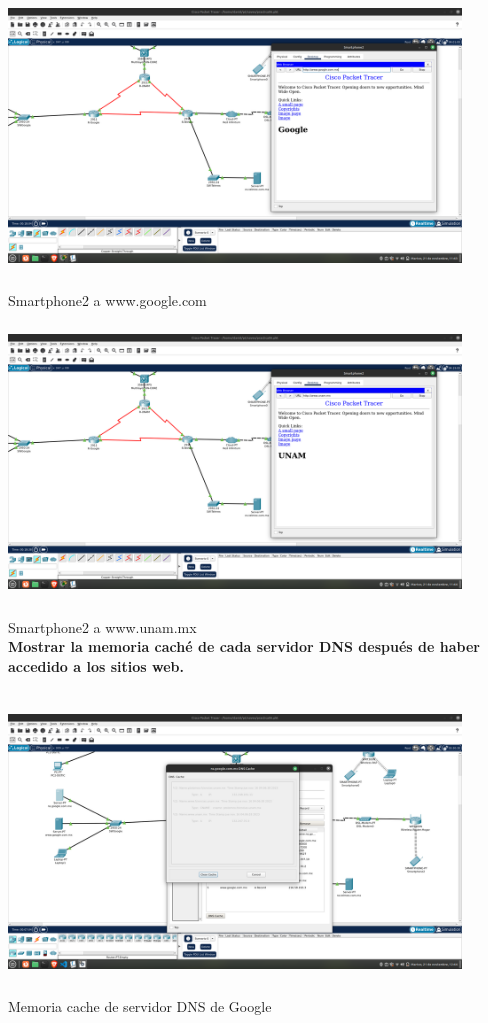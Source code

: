 \documentclass[14pt]{book}
\begin{document}
\includegraphics[width=12cm, height=8cm]{images/prueba 4-5 siiiiii.png} Smartphone2 a  www.google.com\\

\includegraphics[width=12cm, height=8cm]{images/prueba 5 siiiiii.png} Smartphone2 a  www.unam.mx\\

\textbf{ Mostrar la memoria caché de cada servidor DNS después de haber accedido a los sitios web.}
\vspace{1em}

\includegraphics[width=12cm, height=8cm]{images/cache dns google.png} Memoria cache de servidor DNS de Google\\
\end{document}
